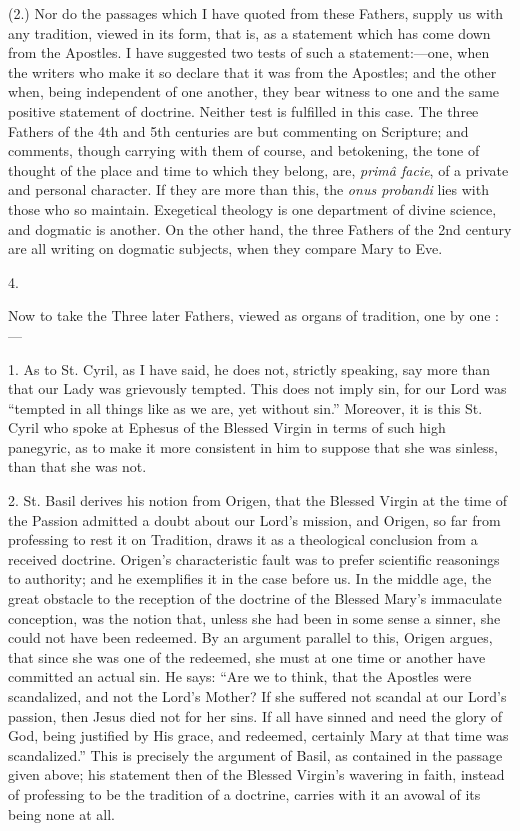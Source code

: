 (2.) Nor do the passages which I have quoted from these Fathers,
supply us with any tradition, viewed in its form, that is, as a
statement which has come down from the Apostles. I have suggested two
tests of such a statement:—one, when the writers who make it so
declare that it was from the Apostles; and the other when, being
independent of one another, they bear witness to one and the same
positive statement of doctrine. Neither test is fulfilled in this case.
The three Fathers of the 4th and 5th centuries are but commenting on
Scripture; and comments, though carrying with them of course, and
betokening, the tone of thought of the place and time to which they
belong, are, \emph{primâ facie}, of a private and personal character.
If they are more than this, the \emph{onus probandi} lies with those who
so maintain. Exegetical theology is one department of divine
science, and dogmatic is another. On the other hand, the three Fathers
of the 2nd century are all writing on dogmatic subjects, when they
compare Mary to Eve.


4.


Now to take the Three later Fathers, viewed as organs of tradition,
one by one :—


1. As to St. Cyril, as I have said, he does not, strictly speaking,
say more than that our Lady was grievously tempted. This does not imply
sin, for our Lord was ``tempted in all things like as we are, yet
without sin.'' Moreover, it is this St. Cyril who spoke at Ephesus
of the Blessed Virgin in terms of such high panegyric, as to make it
more consistent in him to suppose that she was sinless, than that she
was not.


2. St. Basil derives his notion from Origen, that the Blessed Virgin
at the time of the Passion admitted a doubt about our Lord's mission,
and Origen, so far from professing to rest it on Tradition, draws it as
a theological conclusion from a received doctrine. Origen's
characteristic fault was to prefer scientific reasonings to authority;
and he exemplifies it in the case before us. In the middle age, the
great obstacle to the reception of the doctrine of the Blessed Mary's
immaculate conception, was the notion that, unless she had been in some
sense a sinner, she could not have been redeemed. By an argument
parallel to this, Origen argues, that since she was one of the redeemed,
she must at one time or another have committed an actual sin. He says:
``Are we to think, that the Apostles were scandalized, and not the
Lord's Mother? If she suffered not scandal at our Lord's passion,
then Jesus died not for her sins. If all have sinned and need the glory
of God, being justified by His grace, and redeemed, certainly Mary at
that time was scandalized.'' This is precisely the argument of
Basil, as contained in the passage given above; his statement then of
the Blessed Virgin's wavering in faith, instead of professing to be the
tradition of a doctrine, carries with it an avowal of its being none at
all.


